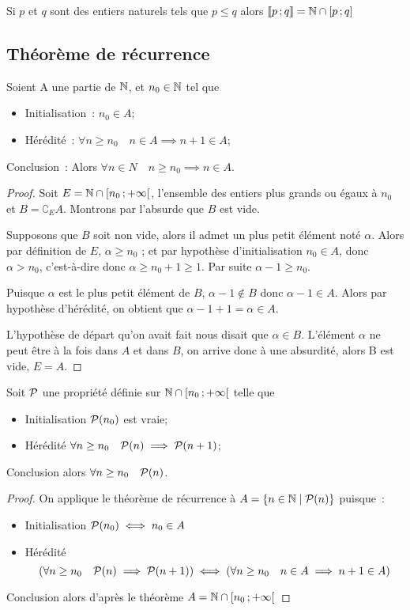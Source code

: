  Si $p$ et $q$ sont des entiers naturels tels que $p\leq q$ alors $\intervalleentier{p}{q}= \N\cap\intervalleff{p}{q}$ 

\subsection{Théorème de récurrence}

\begin{theo}
  \label{theo:rec}
  Soient A une partie de $\N$, et $n_0\in\N$ tel que
  \begin{itemize}
  \item Initialisation~: $n_0\in A$;
  \item Hérédité~: $\forall n\geq n_0 \quad n\in A \implies n+1\in A$;
  \end{itemize}
  Conclusion~: Alors $\forall n \in N \quad n\geq n_0 \implies n \in A$.
\end{theo}
\begin{proof}
  Soit $E=\N\cap \intervallefo{n_0}{+\infty}$, l'ensemble des entiers plus grands ou égaux à $n_0$ et $B=\complement_E A$. Montrons par l'absurde que $B$ est vide. 

Supposons que $B$ soit non vide, alors il admet un plus petit élément noté $\alpha$. Alors par définition de $E$, $\alpha\geq n_0$ ; et par hypothèse d'initialisation $n_0\in A$, donc $\alpha > n_0$, c'est-à-dire donc $\alpha\geq n_0+1\geq 1$. Par suite $\alpha-1\geq n_0$. 

Puisque $\alpha$ est le plus petit élément de $B$, $\alpha-1 \notin B$ donc $\alpha-1 \in A$. Alors par hypothèse d'hérédité, on obtient que $\alpha-1+1=\alpha\in A$. 

L'hypothèse de départ qu'on avait fait nous disait que $\alpha \in B$. L'élément $\alpha$ ne peut être à la fois dans $A$ et dans $B$, on arrive donc à une absurdité, alors B est vide, $E=A$.
\end{proof}
\begin{cor}
  \label{cor:recsimple}
  Soit $\P$ une propriété définie sur $\N\cap \intervallefo{n_0}{+\infty}$ telle que
  \begin{itemize}
  \item Initialisation $\P(n_0)$ est vraie;
  \item Hérédité $\forall n\geq n_0 \quad \P(n) \implies \P(n+1)$;
  \end{itemize}
  Conclusion alors $\forall n\geq n_0 \quad \P(n)$.
\end{cor}
\begin{proof}
  On applique le théorème de récurrence à $A=\enstq{n\in\N}{\P(n)}$ puisque~:
  \begin{itemize}
  \item Initialisation $\P(n_0) \iff n_0 \in A$
  \item Hérédité
    \begin{equation}
      \left(\forall n\geq n_0 \quad \P(n) \implies \P(n+1)\right) \iff \left( \forall n \geq n_0 \quad n\in A \implies n+1\in A\right)
    \end{equation}
  \end{itemize}
  Conclusion alors d'après le théorème $A=\N\cap \intervallefo{n_0}{+\infty}$
\end{proof}
